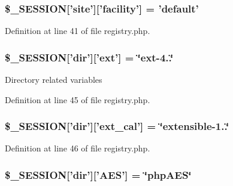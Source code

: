 \hypertarget{registry_8php_a74c68f0f19dcc92302c3f4cb06586556}{
\subsubsection[{\$\-\_\-\-S\-E\-S\-S\-I\-O\-N}]{\setlength{\rightskip}{0pt plus 5cm}\$\-\_\-\-S\-E\-S\-S\-I\-O\-N\mbox{[}'site'\mbox{]}\mbox{[}'facility'\mbox{]} = 'default'}}\label{registry_8php_a74c68f0f19dcc92302c3f4cb06586556}


\-Definition at line 41 of file registry.\-php.

\hypertarget{registry_8php_ac4a760f23d904ff9a7f6e5b2d1b53946}{
\subsubsection[{\$\-\_\-\-S\-E\-S\-S\-I\-O\-N}]{\setlength{\rightskip}{0pt plus 5cm}\$\-\_\-\-S\-E\-S\-S\-I\-O\-N\mbox{[}'dir'\mbox{]}\mbox{[}'ext'\mbox{]} = \char`\"{}ext-\/4..\char`\"{}}}\label{registry_8php_ac4a760f23d904ff9a7f6e5b2d1b53946}
\-Directory related variables 

\-Definition at line 45 of file registry.\-php.

\hypertarget{registry_8php_a6532e3ef9690894f343bb3633b185d4f}{
\subsubsection[{\$\-\_\-\-S\-E\-S\-S\-I\-O\-N}]{\setlength{\rightskip}{0pt plus 5cm}\$\-\_\-\-S\-E\-S\-S\-I\-O\-N\mbox{[}'dir'\mbox{]}\mbox{[}'ext\-\_\-cal'\mbox{]} = \char`\"{}extensible-\/1..\char`\"{}}}\label{registry_8php_a6532e3ef9690894f343bb3633b185d4f}


\-Definition at line 46 of file registry.\-php.

\hypertarget{registry_8php_a76ef65b7dd592e95ffa94107607e34f4}{
\subsubsection[{\$\-\_\-\-S\-E\-S\-S\-I\-O\-N}]{\setlength{\rightskip}{0pt plus 5cm}\$\-\_\-\-S\-E\-S\-S\-I\-O\-N\mbox{[}'dir'\mbox{]}\mbox{[}'{\bf \-A\-E\-S}'\mbox{]} = \char`\"{}php\-A\-E\-S\char`\"{}}}\label{registry_8php_a76ef65b7dd592e95ffa94107607e34f4}


